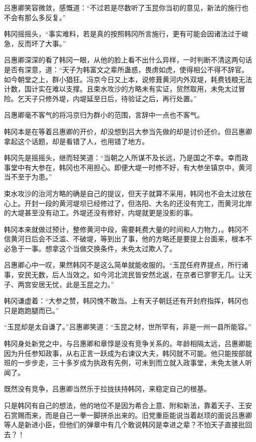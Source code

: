吕惠卿笑容微敛，感慨道：“不过若是尽数听了玉昆你当初的意见，新法的施行也不会有那么多反复。”

韩冈摇摇头，“事实难料，若是真的按照韩冈所言施行，更有可能会因诸法过于峻急，反而坏了大事。”

吕惠卿深深的看了韩冈一眼，从他的脸上看不出什么异样，一时判断不清这两句话是否有深意，道：“天子为韩富文之辈所蛊惑，畏虏如虎，使得相公不得不辞官。如今朝堂之上，群小猖狂。冯京今日又上本，说修葺黄河内外双堤，耗费钱粮无法计数，国计实在难以支撑。且束水攻沙的方略未有实证，贸然取用，未免太过冒险。乞天子只修外堤，内堤延至日后，待验证之后，再行处置。”

吕惠卿毫不客气的将冯京归为群小的范围，言辞中一点也不客气。

韩冈本是在等着吕惠卿的开价，却没想到吕大参当先做的却是讨价还价。但吕惠卿拿起这个话题，却是看错了人，也用错了地方。

韩冈先是摇摇头，继而轻笑道：“当朝之人所谋不及长远，乃是国之不幸。幸而政事堂中有大参在，韩冈也不用担心。即便大堤一时修不好，有大参坐镇京中，黄河当不至于为患。”

束水攻沙的治河方略的确是自己的提议，但天子就算不采用，韩冈也不会太过放在心上。开封一段的黄河堤坝已经修过了，但洛阳、大名的还没有完工，而黄河北岸的大堤甚至没有动工。外堤还没有修好，内堤就更是没影的事。

韩冈本来就做过预计，整修黄河中段，需要耗费大量的时间和人力物力，。韩冈不信黄河日后会不泛滥、不破堤，等到出了事，他的方略还是要提上台面来，根本不必急于一事。想拿这个当做交换条件，未免太过欺人了。

吕惠卿心中一叹，果然韩冈不是这么简单就能收服的。“玉昆任府界提点，所行诸事，安民无数，后人当效之。如今河北流民皆安然北返，在京者已寥寥无几。让天子、两宫安居无忧，此是玉昆之力。”

韩冈谦虚着：“大参之赞，韩冈愧不敢当。上有天子朝廷还有开封府指挥，韩冈也只是跑跑腿而已。”

“玉昆却是太自谦了。”吕惠卿笑道：“玉昆之材，世所罕有，非是一州一县所能容。”

韩冈身处新党之中，与吕惠卿和章惇是没有竞争关系的。年龄相隔太远，吕惠卿能因为升任参知政事，从右正言一跃成为右谏议大夫，韩冈就不可能。他只能按部就班的一步步走，三十多岁成为执政有先例，可未到而立就入政事堂，未免太骇人听闻了。

既然没有竞争，吕惠卿当然乐于拉拢扶持韩冈，来稳定自己的根基。

只是韩冈有自己的想法，他的地位不是因为希合上意、附和新法，靠着天子、王安石赏赐而来，而是自己一拳一脚拼杀出来的。旧党重臣能说当着赵顼的面说吕惠卿等人是新进小臣，但他们的弹章中有几个敢说韩冈是幸进之辈？不怕天子直接批回去？！

